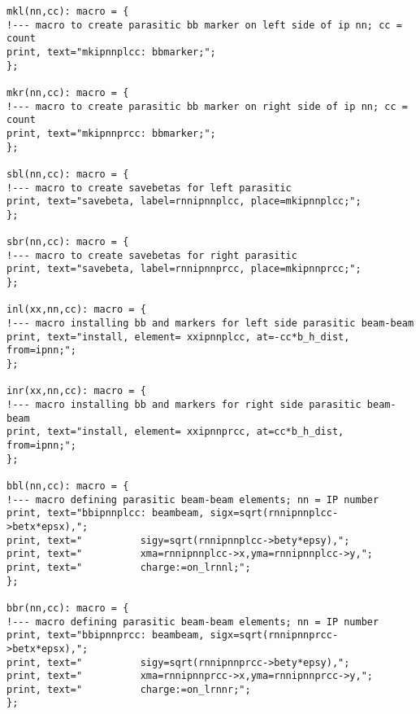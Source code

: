 \begin{verbatim}
mkl(nn,cc): macro = {
!--- macro to create parasitic bb marker on left side of ip nn; cc = count
print, text="mkipnnplcc: bbmarker;";
};

mkr(nn,cc): macro = {
!--- macro to create parasitic bb marker on right side of ip nn; cc = count
print, text="mkipnnprcc: bbmarker;";
};

sbl(nn,cc): macro = {
!--- macro to create savebetas for left parasitic
print, text="savebeta, label=rnnipnnplcc, place=mkipnnplcc;";
};

sbr(nn,cc): macro = {
!--- macro to create savebetas for right parasitic
print, text="savebeta, label=rnnipnnprcc, place=mkipnnprcc;";
};

inl(xx,nn,cc): macro = {
!--- macro installing bb and markers for left side parasitic beam-beam
print, text="install, element= xxipnnplcc, at=-cc*b_h_dist, from=ipnn;";
};

inr(xx,nn,cc): macro = {
!--- macro installing bb and markers for right side parasitic beam-beam
print, text="install, element= xxipnnprcc, at=cc*b_h_dist, from=ipnn;";
};

bbl(nn,cc): macro = {
!--- macro defining parasitic beam-beam elements; nn = IP number
print, text="bbipnnplcc: beambeam, sigx=sqrt(rnnipnnplcc->betx*epsx),";
print, text="          sigy=sqrt(rnnipnnplcc->bety*epsy),";
print, text="          xma=rnnipnnplcc->x,yma=rnnipnnplcc->y,";
print, text="          charge:=on_lrnnl;";
};

bbr(nn,cc): macro = {
!--- macro defining parasitic beam-beam elements; nn = IP number
print, text="bbipnnprcc: beambeam, sigx=sqrt(rnnipnnprcc->betx*epsx),";
print, text="          sigy=sqrt(rnnipnnprcc->bety*epsy),";
print, text="          xma=rnnipnnprcc->x,yma=rnnipnnprcc->y,";
print, text="          charge:=on_lrnnr;";
};
\end{verbatim}


